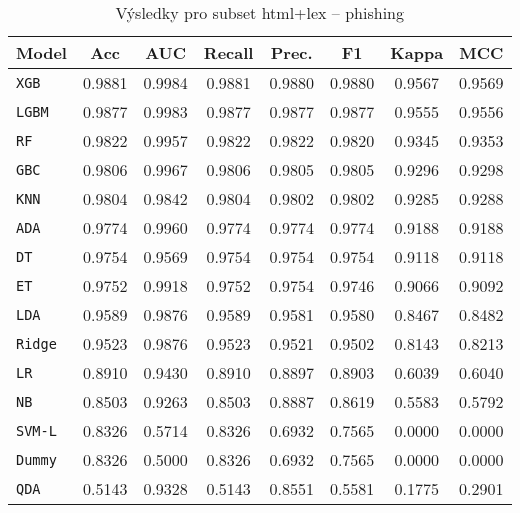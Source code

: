 \begin{table}[H]
  \centering
  \small
  \caption{Výsledky pro subset html+lex – phishing}
  \begin{tabular}{|l|c|c|c|c|c|c|c|}
    \hline
    \textbf{Model} & \textbf{Acc} & \textbf{AUC} & \textbf{Recall} & \textbf{Prec.} & \textbf{F1} & \textbf{Kappa} & \textbf{MCC} \\
    \hline
    \texttt{XGB} & 0.9881 & 0.9984 & 0.9881 & 0.9880 & 0.9880 & 0.9567 & 0.9569 \\
    \texttt{LGBM} & 0.9877 & 0.9983 & 0.9877 & 0.9877 & 0.9877 & 0.9555 & 0.9556 \\
    \texttt{RF} & 0.9822 & 0.9957 & 0.9822 & 0.9822 & 0.9820 & 0.9345 & 0.9353 \\
    \texttt{GBC} & 0.9806 & 0.9967 & 0.9806 & 0.9805 & 0.9805 & 0.9296 & 0.9298 \\
    \texttt{KNN} & 0.9804 & 0.9842 & 0.9804 & 0.9802 & 0.9802 & 0.9285 & 0.9288 \\
    \texttt{ADA} & 0.9774 & 0.9960 & 0.9774 & 0.9774 & 0.9774 & 0.9188 & 0.9188 \\
    \texttt{DT} & 0.9754 & 0.9569 & 0.9754 & 0.9754 & 0.9754 & 0.9118 & 0.9118 \\
    \texttt{ET} & 0.9752 & 0.9918 & 0.9752 & 0.9754 & 0.9746 & 0.9066 & 0.9092 \\
    \texttt{LDA} & 0.9589 & 0.9876 & 0.9589 & 0.9581 & 0.9580 & 0.8467 & 0.8482 \\
    \texttt{Ridge} & 0.9523 & 0.9876 & 0.9523 & 0.9521 & 0.9502 & 0.8143 & 0.8213 \\
    \texttt{LR} & 0.8910 & 0.9430 & 0.8910 & 0.8897 & 0.8903 & 0.6039 & 0.6040 \\
    \texttt{NB} & 0.8503 & 0.9263 & 0.8503 & 0.8887 & 0.8619 & 0.5583 & 0.5792 \\
    \texttt{SVM-L} & 0.8326 & 0.5714 & 0.8326 & 0.6932 & 0.7565 & 0.0000 & 0.0000 \\
    \texttt{Dummy} & 0.8326 & 0.5000 & 0.8326 & 0.6932 & 0.7565 & 0.0000 & 0.0000 \\
    \texttt{QDA} & 0.5143 & 0.9328 & 0.5143 & 0.8551 & 0.5581 & 0.1775 & 0.2901 \\
    \hline
  \end{tabular}
\end{table}
\vspace{0.5cm}

